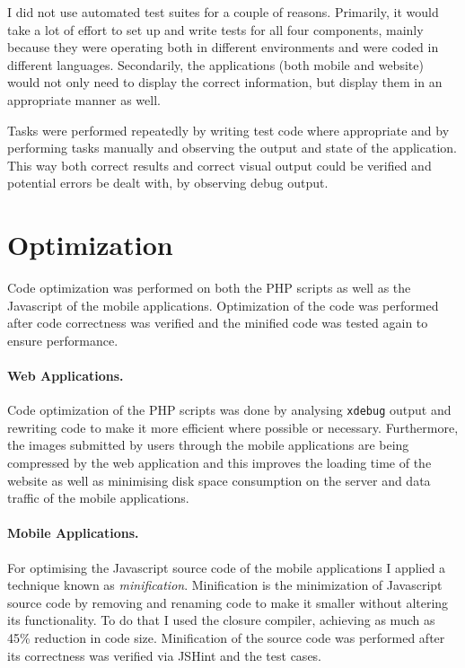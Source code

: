 \documentclass[12pt]{ecsproject}     %
\begin{document}
I did not use automated test suites for a couple of reasons. Primarily, it would take a lot of effort to set up and write tests for all four components, mainly because they were operating both in different environments and were coded in different languages. Secondarily, the applications (both mobile and website) would not only need to display the correct information, but display them in an appropriate manner as well. 

Tasks were performed repeatedly by writing test code where appropriate and by performing tasks manually and observing the output and state of the application. This way both correct results and correct visual output could be verified and potential errors be dealt with, by observing debug output.

\section{Optimization}
Code optimization was performed on both the PHP scripts as well as the Javascript of the mobile applications. Optimization of the code was performed after code correctness was verified and the minified code was tested again to ensure performance.

\paragraph{Web Applications.} Code optimization of the PHP scripts was done by analysing \texttt{xdebug} output and rewriting code to make it more efficient where possible or necessary. Furthermore, the images submitted by users through the mobile applications are being compressed by the web application and this improves the loading time of the website as well as minimising disk space consumption on the server and data traffic of the mobile applications.

\paragraph{Mobile Applications.} For optimising the Javascript source code of the mobile applications I applied a technique known as \textit{minification}. Minification is the minimization of Javascript source code by removing and renaming code to make it smaller without altering its functionality. To do that I used the closure compiler, achieving as much as 45\% reduction in code size. Minification of the source code was performed after its correctness was verified via JSHint and the test cases.
\end{document}
